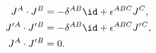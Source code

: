 \begin{equation}
\label{2SU2struc}
\begin{aligned}
   J^{A}\cdot J^{B} &=-\delta^{AB}\id +\epsilon^{ABC}J^{C} , \\
   J'{}^{A}\cdot J'{}^{B} &= -\delta^{AB}\id +\epsilon^{ABC}J'{}^{C} , \\
   J^{A}\cdot J'{}^{B} &= 0 .
\end{aligned}
\end{equation}

